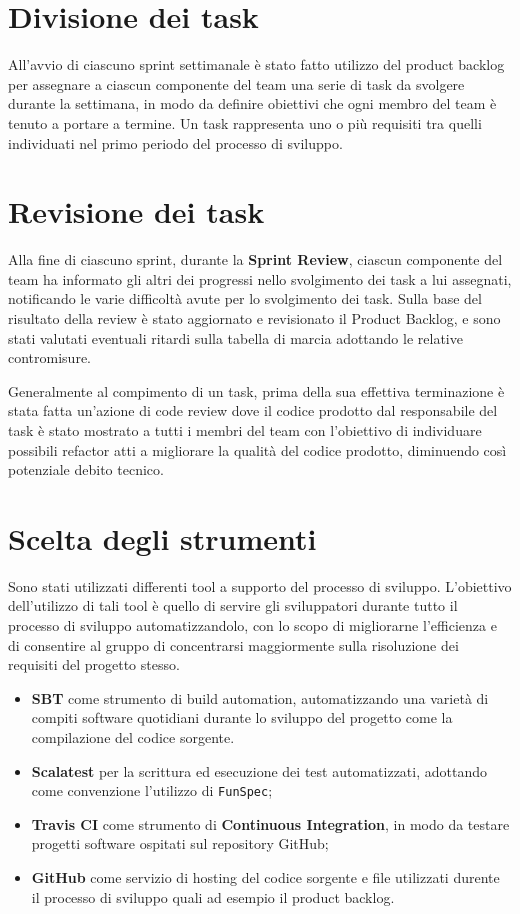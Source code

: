 \section{Divisione dei task}
All'avvio di ciascuno sprint settimanale è stato fatto utilizzo del product backlog per assegnare a ciascun componente del team una serie di task da svolgere durante la settimana, in modo da definire obiettivi che ogni membro del team è tenuto a portare a termine. Un task rappresenta uno o più requisiti tra quelli individuati nel primo periodo del processo di sviluppo.

\section{Revisione dei task}
Alla fine di ciascuno sprint, durante la \textbf{Sprint Review}, ciascun componente del team ha informato gli altri dei progressi nello svolgimento dei task a lui assegnati, notificando le varie difficoltà avute per lo svolgimento dei task. Sulla base del risultato della review è stato aggiornato e revisionato il Product Backlog, e sono stati valutati eventuali ritardi sulla tabella di marcia adottando le relative contromisure.

Generalmente al compimento di un task, prima della sua effettiva terminazione è stata fatta un'azione di code review dove il codice prodotto dal responsabile del task è stato mostrato a tutti i membri del team con l'obiettivo di individuare possibili refactor atti a migliorare la qualità del codice prodotto, diminuendo così potenziale debito tecnico.

\section{Scelta degli strumenti}
Sono stati utilizzati differenti tool a supporto del processo di sviluppo. L'obiettivo dell'utilizzo di tali tool è quello di servire gli sviluppatori durante tutto il processo di sviluppo automatizzandolo, con lo scopo di migliorarne l'efficienza e di consentire al gruppo di concentrarsi maggiormente sulla risoluzione dei requisiti del progetto stesso.

\begin{itemize}
    \item \textbf{SBT} come strumento di build automation, automatizzando una varietà di compiti software quotidiani durante lo sviluppo del progetto come la compilazione del codice sorgente.
    \item \textbf{Scalatest} per la scrittura ed esecuzione dei test automatizzati, adottando come convenzione l'utilizzo di \texttt{FunSpec};
    \item \textbf{Travis CI} come strumento di \textbf{Continuous Integration}, in modo da testare progetti software ospitati sul repository GitHub;
    \item \textbf{GitHub} come servizio di hosting del codice sorgente e file utilizzati durente il processo di sviluppo quali ad esempio il product backlog. 
\end{itemize}